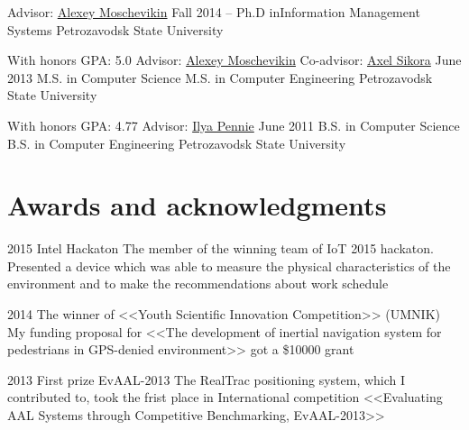 \documentclass{tccv}
\begin{document}
\begin{yearlist}

\item[Advisor: \href{http://lab127.karelia.ru/~alexmou/resume_alexmou_eng.pdf}{Alexey Moschevikin}]{Fall 2014 --}
     {Ph.D in\newline Information Management Systems}
     {Petrozavodsk State University}

\item[With honors \newline GPA: 5.0 \newline
      Advisor: \href{http://lab127.karelia.ru/~alexmou/resume_alexmou_eng.pdf}{Alexey Moschevikin} \newline
      Co-advisor: \href{https://ei.hs-offenburg.de/nc/ansprechpartner/personen-details-lsf-cache/lsf/704/6/1127/} {Axel Sikora}]{June 2013}
     {M.S. in Computer Science 
      \newline 
      M.S. in Computer Engineering}
     {Petrozavodsk State University}

\item[With honors \newline GPA: 4.77 \newline
      Advisor: \href{http://openbudgetrf.ru/sotrudnik-publications/4/}{Ilya Pennie}]{June 2011}
     {B.S. in Computer Science 
      \newline 
      B.S. in Computer Engineering}
     {Petrozavodsk State University}

\end{yearlist}

\section{Awards and acknowledgments}

\begin{yearlist}
\item {2015}
     {Intel Hackaton}
     {The member of the winning team of IoT
2015 hackaton. Presented a device which was able to measure the physical characteristics of the environment and to make the recommendations about work schedule}

\item{2014}
     {The winner of <<Youth Scientific Innovation
Competition>> (UMNIK)}
     {My funding proposal for <<The
development of inertial navigation system for pedestrians
in GPS-denied environment>> got a \$10000 grant}

\item{2013}
     {First prize EvAAL-2013}
     {The RealTrac positioning system, which I contributed to, took the frist place in International competition <<Evaluating AAL Systems through Competitive Benchmarking, EvAAL-2013>>}

\end{yearlist}
\end{document}
